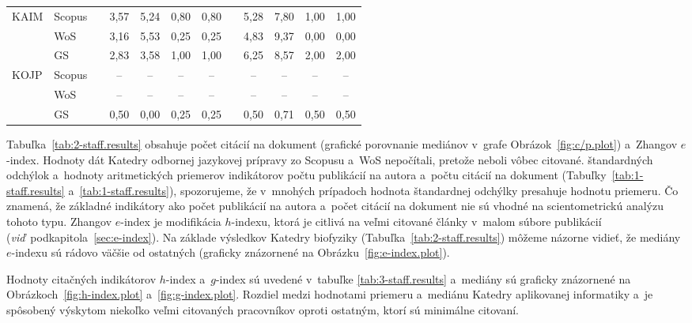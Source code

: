 \begin{table}
\begin{tabularx}{\textwidth}{XXp{1ex}ccccp{1ex}cccc}
    KAIM & Scopus & & 3,57  & 5,24  & 0,80  & 0,80  & & 5,28  & 7,80  & 1,00  & 1,00  \\
         & WoS    & & 3,16  & 5,53  & 0,25  & 0,25  & & 4,83  & 9,37  & 0,00  & 0,00  \\
         & GS     & & 2,83  & 3,58  & 1,00  & 1,00  & & 6,25  & 8,57  & 2,00  & 2,00  \\[1ex]
    KOJP & Scopus & & --    & --    & --    & --    & & --    & --    & --    & --    \\
         & WoS    & & --    & --    & --    & --    & & --    & --    & --    & --    \\
         & GS     & & 0,50  & 0,00  & 0,25  & 0,25  & & 0,50  & 0,71  & 0,50  & 0,50  \\
    \bottomrule
  \end{tabularx}
\end{table}

Tabuľka~\ref{tab:2-staff.results} obsahuje počet citácií na dokument (grafické
porovnanie mediánov v~grafe Obrázok~\ref{fig:c/p.plot}) a~Zhangov $e$-index.
Hodnoty dát Katedry odbornej jazykovej prípravy zo Scopusu a~WoS nepočítali,
pretože neboli vôbec citované.  štandardných odchýlok a~hodnoty aritmetických
priemerov indikátorov počtu publikácií na autora a~počtu citácií na dokument
(Tabuľky~\ref{tab:1-staff.results} a~\ref{tab:1-staff.results}), spozorujeme, že
v~mnohých prípadoch hodnota štandardnej odchýlky presahuje hodnotu priemeru.  Čo
znamená, že základné indikátory ako počet publikácií na autora a~počet citácií
na dokument nie sú vhodné na scientometrickú analýzu tohoto typu.  Zhangov
$e$-index je modifikácia $h$-indexu, ktorá je citlivá na veľmi citované články
v~malom súbore publikácií (\emph{viď}~podkapitola~\ref{sec:e-index}).  Na
základe výsledkov Katedry biofyziky (Tabuľka~\ref{tab:2-staff.results}) môžeme
názorne vidieť, že mediány $e$-indexu sú rádovo väčšie od ostatných (graficky
znázornené na Obrázku~\ref{fig:e-index.plot}).

Hodnoty citačných indikátorov $h$-index a~$g$-index sú uvedené v~tabuľke
\ref{tab:3-staff.results} a~mediány sú graficky znázornené na
Obrázkoch~\ref{fig:h-index.plot} a~\ref{fig:g-index.plot}.  Rozdiel medzi
hodnotami priemeru a~mediánu Katedry aplikovanej informatiky a~je spôsobený
výskytom niekoľko veľmi citovaných pracovníkov oproti ostatným, ktorí sú
minimálne citovaní.

